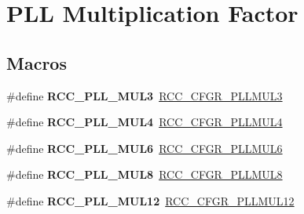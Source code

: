 \hypertarget{group___r_c_c___p_l_l___multiplication___factor}{\section{P\-L\-L Multiplication Factor}
\label{group___r_c_c___p_l_l___multiplication___factor}
}
\subsection*{Macros}
\begin{DoxyCompactItemize}
\item 
\hypertarget{group___r_c_c___p_l_l___multiplication___factor_ga4ee529382af73885706795fd81538781}{\#define {\bfseries R\-C\-C\-\_\-\-P\-L\-L\-\_\-\-M\-U\-L3}~\hyperlink{group___peripheral___registers___bits___definition_ga599cf14f159345374d91a96e645b105b}{R\-C\-C\-\_\-\-C\-F\-G\-R\-\_\-\-P\-L\-L\-M\-U\-L3}}\label{group___r_c_c___p_l_l___multiplication___factor_ga4ee529382af73885706795fd81538781}

\item 
\hypertarget{group___r_c_c___p_l_l___multiplication___factor_ga2aedc8bc6552d98fb748b58a2379820b}{\#define {\bfseries R\-C\-C\-\_\-\-P\-L\-L\-\_\-\-M\-U\-L4}~\hyperlink{group___peripheral___registers___bits___definition_gaf76c27dba3f4be2433fd5a384a1877ae}{R\-C\-C\-\_\-\-C\-F\-G\-R\-\_\-\-P\-L\-L\-M\-U\-L4}}\label{group___r_c_c___p_l_l___multiplication___factor_ga2aedc8bc6552d98fb748b58a2379820b}

\item 
\hypertarget{group___r_c_c___p_l_l___multiplication___factor_gae2f8dd748556470dcac6901ac7a3e650}{\#define {\bfseries R\-C\-C\-\_\-\-P\-L\-L\-\_\-\-M\-U\-L6}~\hyperlink{group___peripheral___registers___bits___definition_gaf7e89d2d6400ab0e8583b6016ace93b7}{R\-C\-C\-\_\-\-C\-F\-G\-R\-\_\-\-P\-L\-L\-M\-U\-L6}}\label{group___r_c_c___p_l_l___multiplication___factor_gae2f8dd748556470dcac6901ac7a3e650}

\item 
\hypertarget{group___r_c_c___p_l_l___multiplication___factor_gaddfa6ebdecba8c5951a774b271fa82eb}{\#define {\bfseries R\-C\-C\-\_\-\-P\-L\-L\-\_\-\-M\-U\-L8}~\hyperlink{group___peripheral___registers___bits___definition_ga8a409fec792612f0583ed37fd5bffd16}{R\-C\-C\-\_\-\-C\-F\-G\-R\-\_\-\-P\-L\-L\-M\-U\-L8}}\label{group___r_c_c___p_l_l___multiplication___factor_gaddfa6ebdecba8c5951a774b271fa82eb}

\item 
\hypertarget{group___r_c_c___p_l_l___multiplication___factor_gaca5a5ddd829f682dd9a211e6a9be452a}{\#define {\bfseries R\-C\-C\-\_\-\-P\-L\-L\-\_\-\-M\-U\-L12}~\hyperlink{group___peripheral___registers___bits___definition_gad4d4ff081f554fcb4278df9f259f2392}{R\-C\-C\-\_\-\-C\-F\-G\-R\-\_\-\-P\-L\-L\-M\-U\-L12}}\label{group___r_c_c___p_l_l___multiplication___factor_gaca5a5ddd829f682dd9a211e6a9be452a}


\end{DoxyCompactItemize}

